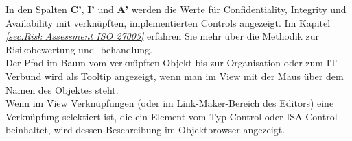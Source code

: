 \documentclass[a4paper,10pt]{book}
\begin{document}
In den Spalten \textbf{C'}, \textbf{I'} und \textbf{A'} werden die Werte für Confidentiality, Integrity und Availability mit verknüpften, implementierten Controls angezeigt.
Im Kapitel {\em \ref{sec:Risk Assessment ISO 27005}  } erfahren Sie mehr über die Methodik zur Risikobewertung und -behandlung.
\newline\\
Der Pfad im Baum vom verknüpften Objekt bis zur Organisation oder zum IT-Verbund wird als Tooltip angezeigt, wenn man im View mit der Maus über dem Namen des Objektes steht.
\newline\\
Wenn im View Verknüpfungen (oder im Link-Maker-Bereich des Editors) eine Verknüpfung selektiert ist, die ein Element vom Typ Control oder ISA-Control beinhaltet, wird
dessen Beschreibung im Objektbrowser angezeigt.
\end{document}
